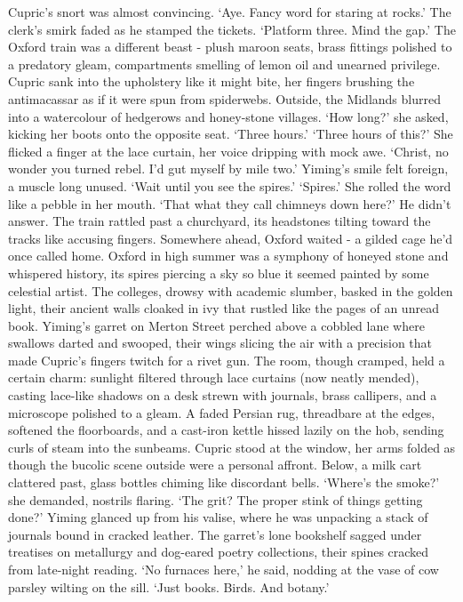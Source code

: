Cupric's snort was almost convincing. `Aye. Fancy word for staring at rocks.'
The clerk's smirk faded as he stamped the tickets. `Platform three. Mind the gap.'
The Oxford train was a different beast - plush maroon seats, brass fittings polished to a predatory gleam, compartments smelling of lemon oil and unearned privilege. Cupric sank into the upholstery like it might bite, her fingers brushing the antimacassar as if it were spun from spiderwebs. Outside, the Midlands blurred into a watercolour of hedgerows and honey-stone villages.
`How long?' she asked, kicking her boots onto the opposite seat.
`Three hours.'
`Three hours of this?' She flicked a finger at the lace curtain, her voice dripping with mock awe. `Christ, no wonder you turned rebel. I'd gut myself by mile two.'
Yiming's smile felt foreign, a muscle long unused. `Wait until you see the spires.'
`Spires.' She rolled the word like a pebble in her mouth. `That what they call chimneys down here?'
He didn't answer. The train rattled past a churchyard, its headstones tilting toward the tracks like accusing fingers. Somewhere ahead, Oxford waited - a gilded cage he'd once called home.
Oxford in high summer was a symphony of honeyed stone and whispered history, its spires piercing a sky so blue it seemed painted by some celestial artist. The colleges, drowsy with academic slumber, basked in the golden light, their ancient walls cloaked in ivy that rustled like the pages of an unread book. Yiming's garret on Merton Street perched above a cobbled lane where swallows darted and swooped, their wings slicing the air with a precision that made Cupric's fingers twitch for a rivet gun. The room, though cramped, held a certain charm: sunlight filtered through lace curtains (now neatly mended), casting lace-like shadows on a desk strewn with journals, brass callipers, and a microscope polished to a gleam. A faded Persian rug, threadbare at the edges, softened the floorboards, and a cast-iron kettle hissed lazily on the hob, sending curls of steam into the sunbeams.
Cupric stood at the window, her arms folded as though the bucolic scene outside were a personal affront. Below, a milk cart clattered past, glass bottles chiming like discordant bells. `Where's the smoke?' she demanded, nostrils flaring. `The grit? The proper stink of things getting done?'
Yiming glanced up from his valise, where he was unpacking a stack of journals bound in cracked leather. The garret's lone bookshelf sagged under treatises on metallurgy and dog-eared poetry collections, their spines cracked from late-night reading. `No furnaces here,' he said, nodding at the vase of cow parsley wilting on the sill. `Just books. Birds. And botany.'
